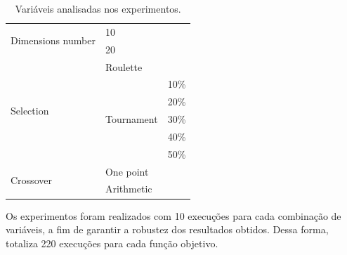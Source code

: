 \begin{table}[!ht]
    \center%
    \begin{tabular}{|l|l|l|}
        \bottomrule
        \multirow{2}{*}{Dimensions number} & \multicolumn{2}{l|}{10}                                 \\ \cline{2-3}
                                           & \multicolumn{2}{l|}{20}                                 \\ \hline
        \multirow{6}{*}{Selection}         & \multicolumn{2}{l|}{Roulette}                           \\ \cline{2-3}
                                           & \multicolumn{1}{l|}{\multirow{5}{*}{Tournament}} & 10\% \\ \cline{3-3}
                                           & \multicolumn{1}{l|}{}                            & 20\% \\ \cline{3-3}
                                           & \multicolumn{1}{l|}{}                            & 30\% \\ \cline{3-3}
                                           & \multicolumn{1}{l|}{}                            & 40\% \\ \cline{3-3}
                                           & \multicolumn{1}{l|}{}                            & 50\% \\ \hline
        \multirow{2}{*}{Crossover}         & \multicolumn{2}{l|}{One point}                          \\ \cline{2-3}
                                           & \multicolumn{2}{l|}{Arithmetic}                         \\ \toprule
    \end{tabular}
    \caption{Variáveis analisadas nos experimentos.}%
    \label{tab:variaveis}
\end{table}

Os experimentos foram realizados com 10 execuções para cada combinação de variáveis, a fim de garantir a robustez dos resultados obtidos.
Dessa forma, totaliza 220 execuções para cada função objetivo.
